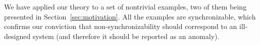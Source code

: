 We have applied our theory to a set of nontrivial examples, two of them being presented in Section~\ref{sec:motivation}. 
All the examples are synchronizable, which confirms our conviction that non-synchronizability should correspond to an ill-designed system (and therefore it should be reported as an anomaly). %


%
%
%
%
%
%
